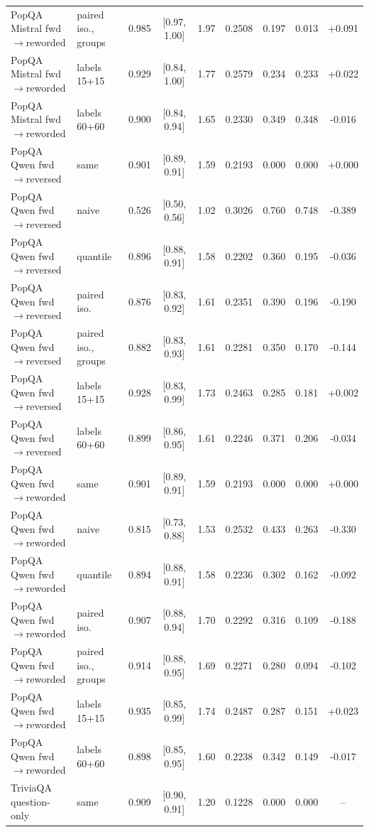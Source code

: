 \documentclass[11pt]{article}
\theoremstyle{definition}
\theoremstyle{remark}
\newcommand{\1}{\mathbf{1}}
\begin{document}
\begin{center}
\begin{tabular}{llccccccc}
PopQA Mistral fwd$\to$reworded & paired iso., groups & 0.985 & [0.97, 1.00] & 1.97 & 0.2508 & 0.197 & 0.013 & +0.091\\
PopQA Mistral fwd$\to$reworded & labels 15+15 & 0.929 & [0.84, 1.00] & 1.77 & 0.2579 & 0.234 & 0.233 & +0.022\\
PopQA Mistral fwd$\to$reworded & labels 60+60 & 0.900 & [0.84, 0.94] & 1.65 & 0.2330 & 0.349 & 0.348 & -0.016\\
\midrule
PopQA Qwen fwd$\to$reversed & same & 0.901 & [0.89, 0.91] & 1.59 & 0.2193 & 0.000 & 0.000 & +0.000\\
PopQA Qwen fwd$\to$reversed & naive & 0.526 & [0.50, 0.56] & 1.02 & 0.3026 & 0.760 & 0.748 & -0.389\\
PopQA Qwen fwd$\to$reversed & quantile & 0.896 & [0.88, 0.91] & 1.58 & 0.2202 & 0.360 & 0.195 & -0.036\\
PopQA Qwen fwd$\to$reversed & paired iso. & 0.876 & [0.83, 0.92] & 1.61 & 0.2351 & 0.390 & 0.196 & -0.190\\
PopQA Qwen fwd$\to$reversed & paired iso., groups & 0.882 & [0.83, 0.93] & 1.61 & 0.2281 & 0.350 & 0.170 & -0.144\\
PopQA Qwen fwd$\to$reversed & labels 15+15 & 0.928 & [0.83, 0.99] & 1.73 & 0.2463 & 0.285 & 0.181 & +0.002\\
PopQA Qwen fwd$\to$reversed & labels 60+60 & 0.899 & [0.86, 0.95] & 1.61 & 0.2246 & 0.371 & 0.206 & -0.034\\
\midrule
PopQA Qwen fwd$\to$reworded & same & 0.901 & [0.89, 0.91] & 1.59 & 0.2193 & 0.000 & 0.000 & +0.000\\
PopQA Qwen fwd$\to$reworded & naive & 0.815 & [0.73, 0.88] & 1.53 & 0.2532 & 0.433 & 0.263 & -0.330\\
PopQA Qwen fwd$\to$reworded & quantile & 0.894 & [0.88, 0.91] & 1.58 & 0.2236 & 0.302 & 0.162 & -0.092\\
PopQA Qwen fwd$\to$reworded & paired iso. & 0.907 & [0.88, 0.94] & 1.70 & 0.2292 & 0.316 & 0.109 & -0.188\\
PopQA Qwen fwd$\to$reworded & paired iso., groups & 0.914 & [0.88, 0.95] & 1.69 & 0.2271 & 0.280 & 0.094 & -0.102\\
PopQA Qwen fwd$\to$reworded & labels 15+15 & 0.935 & [0.85, 0.99] & 1.74 & 0.2487 & 0.287 & 0.151 & +0.023\\
PopQA Qwen fwd$\to$reworded & labels 60+60 & 0.898 & [0.85, 0.95] & 1.60 & 0.2238 & 0.342 & 0.149 & -0.017\\
\midrule
TriviaQA question-only & same & 0.909 & [0.90, 0.91] & 1.20 & 0.1228 & 0.000 & 0.000 & --\\

\end{tabular}
\end{center}
\end{document}
